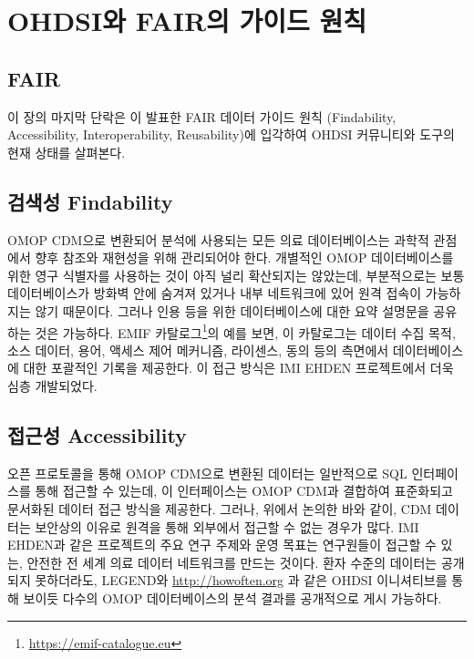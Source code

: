 \documentclass[10.5pt]{book}
\let\rmarkdownfootnote\footnote%
\def\footnote{\protect\rmarkdownfootnote}
\theoremstyle{definition}
\theoremstyle{definition}
\theoremstyle{definition}
\theoremstyle{remark}
\begin{document}
\section{OHDSI와 FAIR의 가이드 원칙}\label{ohdsi-fair--}


\subsection{FAIR}\label{fair}

이 장의 마지막 단락은 \citet{wilkinson2016} 이 발표한 FAIR 데이터 가이드
원칙 (Findability, Accessibility, Interoperability, Reusability)에
입각하여 OHDSI 커뮤니티와 도구의 현재 상태를 살펴본다.

\subsection{검색성 Findability}\label{-findability}

OMOP CDM으로 변환되어 분석에 사용되는 모든 의료 데이터베이스는 과학적
관점에서 향후 참조와 재현성을 위해 관리되어야 한다. 개별적인 OMOP
데이터베이스를 위한 영구 식별자를 사용하는 것이 아직 널리 확산되지는
않았는데, 부분적으로는 보통 데이터베이스가 방화벽 안에 숨겨져 있거나
내부 네트워크에 있어 원격 접속이 가능하지는 않기 때문이다. 그러나 인용
등을 위한 데이터베이스에 대한 요약 설명문을 공유하는 것은 가능하다. EMIF
카탈로그\footnote{\url{https://emif-catalogue.eu}}의 예를 보면, 이
카탈로그는 데이터 수집 목적, 소스 데이터, 용어, 액세스 제어 메커니즘,
라이센스, 동의 등의 측면에서 데이터베이스에 대한 포괄적인 기록을
제공한다. \citep{Oliveira2019} 이 접근 방식은 IMI EHDEN 프로젝트에서
더욱 심층 개발되었다.

\subsection{접근성 Accessibility}\label{-accessibility}

오픈 프로토콜을 통해 OMOP CDM으로 변환된 데이터는 일반적으로 SQL
인터페이스를 통해 접근할 수 있는데, 이 인터페이스는 OMOP CDM과 결합하여
표준화되고 문서화된 데이터 접근 방식을 제공한다. 그러나, 위에서 논의한
바와 같이, CDM 데이터는 보안상의 이유로 원격을 통해 외부에서 접근할 수
없는 경우가 많다. IMI EHDEN과 같은 프로젝트의 주요 연구 주제와 운영
목표는 연구원들이 접근할 수 있는, 안전한 전 세계 의료 데이터 네트워크를
만드는 것이다. 환자 수준의 데이터는 공개되지 못하더라도, LEGEND와
\url{http://howoften.org} 과 같은 OHDSI 이니셔티브를 통해 보이듯 다수의
OMOP 데이터베이스의 분석 결과를 공개적으로 게시 가능하다.
\end{document}
